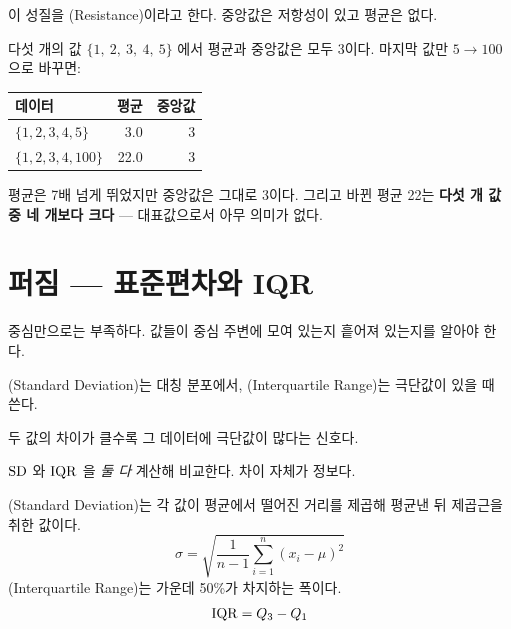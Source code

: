 이 성질을 (Resistance)이라고 한다. 중앙값은 저항성이 있고 평균은
없다.

\begin{example}
\label{ex:resistance}
다섯 개의 값 $\{1,\ 2,\ 3,\ 4,\ 5\}$ 에서 평균과 중앙값은 모두 3이다.
마지막 값만 $5 \to 100$ 으로 바꾸면:

\begin{center}
\begin{tabular}{lrr}
\toprule
데이터 & 평균 & 중앙값 \\
\midrule
$\{1,2,3,4,5\}$   & 3.0  & 3 \\
$\{1,2,3,4,100\}$ & 22.0 & 3 \\
\bottomrule
\end{tabular}
\end{center}

평균은 7배 넘게 뛰었지만 중앙값은 그대로 3이다. 그리고 바뀐 평균 22는
\textbf{다섯 개 값 중 네 개보다 크다} --- 대표값으로서 아무 의미가 없다.
\end{example}

\section{퍼짐 --- 표준편차와 IQR}
\label{sec:spread}

\begin{inbrief}
  \item[Why] 중심만으로는 부족하다. 값들이 중심 주변에 모여 있는지 흩어져 있는지를
             알아야 한다.
  \item[When] (Standard Deviation)는 대칭 분포에서, (Interquartile Range)는 극단값이 있을 때 쓴다.
  \item[Where] 두 값의 차이가 클수록 그 데이터에 극단값이 많다는 신호다.
  \item[How] $\mathrm{SD}$ 와 $\mathrm{IQR}$ 을 \emph{둘 다} 계산해 비교한다. 차이 자체가 정보다.
\end{inbrief}

\begin{definition}[퍼짐의 두 정의]
\label{def:spread}
(Standard Deviation)는 각 값이 평균에서 떨어진 거리를 제곱해
평균낸 뒤 제곱근을 취한 값이다.
\[
  \sigma = \sqrt{\frac{1}{n-1}\sum_{i=1}^{n}(x_i - \mu)^2}
\]
(Interquartile Range)는 가운데 50\%가 차지하는 폭이다.
\[
  \mathrm{IQR} = Q_3 - Q_1
\]
\end{definition}


